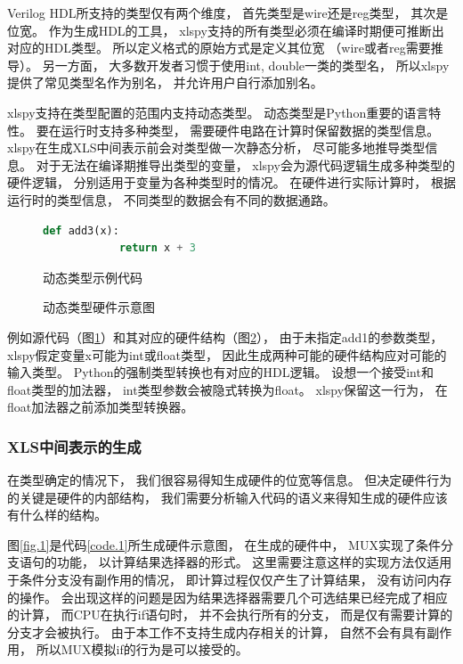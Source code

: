 Verilog HDL所支持的类型仅有两个维度，
首先类型是wire还是reg类型，
其次是位宽。
作为生成HDL的工具，
xlspy支持的所有类型必须在编译时期便可推断出对应的HDL类型。
所以定义格式的原始方式是定义其位宽
（wire或者reg需要推导）。
另一方面，
大多数开发者习惯于使用int, double一类的类型名，
所以xlspy提供了常见类型名作为别名，
并允许用户自行添加别名。

xlspy支持在类型配置的范围内支持动态类型。
动态类型是Python重要的语言特性。
要在运行时支持多种类型，
需要硬件电路在计算时保留数据的类型信息。
xlspy在生成XLS中间表示前会对类型做一次静态分析，
尽可能多地推导类型信息。
对于无法在编译期推导出类型的变量，
xlspy会为源代码逻辑生成多种类型的硬件逻辑，
分别适用于变量为各种类型时的情况。
在硬件进行实际计算时，
根据运行时的类型信息，
不同类型的数据会有不同的数据通路。

\begin{figure}[h]
    \begin{lstlisting}[language=Python,frame=single]
        def add3(x):
            return x + 3
    \end{lstlisting}
    \caption{动态类型示例代码}
    \label{code.2}
\end{figure}

\begin{figure}[h]
\centering

\caption{动态类型硬件示意图}
\label{fig.2}
\end{figure}

例如源代码（图\ref{code.2}）和其对应的硬件结构（图\ref{fig.2}），
由于未指定add1的参数类型，
xlspy假定变量x可能为int或float类型，
因此生成两种可能的硬件结构应对可能的输入类型。
Python的强制类型转换也有对应的HDL逻辑。
设想一个接受int和float类型的加法器，
int类型参数会被隐式转换为float。
xlspy保留这一行为，
在float加法器之前添加类型转换器。

\subsubsection{XLS中间表示的生成}

在类型确定的情况下，
我们很容易得知生成硬件的位宽等信息。
但决定硬件行为的关键是硬件的内部结构，
我们需要分析输入代码的语义来得知生成的硬件应该有什么样的结构。

图\ref{fig.1}是代码\ref{code.1}所生成硬件示意图，
在生成的硬件中，
MUX实现了条件分支语句的功能，
以计算结果选择器的形式。
这里需要注意这样的实现方法仅适用于条件分支没有副作用的情况，
即计算过程仅仅产生了计算结果，
没有访问内存的操作。
会出现这样的问题是因为结果选择器需要几个可选结果已经完成了相应的计算，
而CPU在执行if语句时，
并不会执行所有的分支，
而是仅有需要计算的分支才会被执行。
由于本工作不支持生成内存相关的计算，
自然不会有具有副作用，
所以MUX模拟if的行为是可以接受的。


